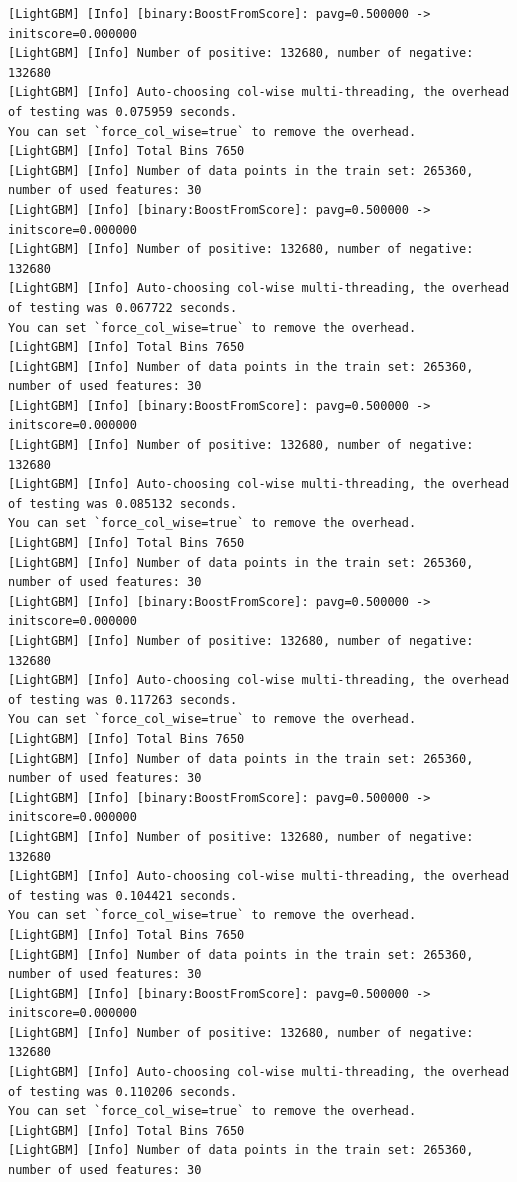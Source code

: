 \documentclass[
  letterpaper,
  DIV=11,
  numbers=noendperiod]{scrartcl}
\begin{document}
\begin{verbatim}
[LightGBM] [Info] [binary:BoostFromScore]: pavg=0.500000 -> initscore=0.000000
[LightGBM] [Info] Number of positive: 132680, number of negative: 132680
[LightGBM] [Info] Auto-choosing col-wise multi-threading, the overhead of testing was 0.075959 seconds.
You can set `force_col_wise=true` to remove the overhead.
[LightGBM] [Info] Total Bins 7650
[LightGBM] [Info] Number of data points in the train set: 265360, number of used features: 30
[LightGBM] [Info] [binary:BoostFromScore]: pavg=0.500000 -> initscore=0.000000
[LightGBM] [Info] Number of positive: 132680, number of negative: 132680
[LightGBM] [Info] Auto-choosing col-wise multi-threading, the overhead of testing was 0.067722 seconds.
You can set `force_col_wise=true` to remove the overhead.
[LightGBM] [Info] Total Bins 7650
[LightGBM] [Info] Number of data points in the train set: 265360, number of used features: 30
[LightGBM] [Info] [binary:BoostFromScore]: pavg=0.500000 -> initscore=0.000000
[LightGBM] [Info] Number of positive: 132680, number of negative: 132680
[LightGBM] [Info] Auto-choosing col-wise multi-threading, the overhead of testing was 0.085132 seconds.
You can set `force_col_wise=true` to remove the overhead.
[LightGBM] [Info] Total Bins 7650
[LightGBM] [Info] Number of data points in the train set: 265360, number of used features: 30
[LightGBM] [Info] [binary:BoostFromScore]: pavg=0.500000 -> initscore=0.000000
[LightGBM] [Info] Number of positive: 132680, number of negative: 132680
[LightGBM] [Info] Auto-choosing col-wise multi-threading, the overhead of testing was 0.117263 seconds.
You can set `force_col_wise=true` to remove the overhead.
[LightGBM] [Info] Total Bins 7650
[LightGBM] [Info] Number of data points in the train set: 265360, number of used features: 30
[LightGBM] [Info] [binary:BoostFromScore]: pavg=0.500000 -> initscore=0.000000
[LightGBM] [Info] Number of positive: 132680, number of negative: 132680
[LightGBM] [Info] Auto-choosing col-wise multi-threading, the overhead of testing was 0.104421 seconds.
You can set `force_col_wise=true` to remove the overhead.
[LightGBM] [Info] Total Bins 7650
[LightGBM] [Info] Number of data points in the train set: 265360, number of used features: 30
[LightGBM] [Info] [binary:BoostFromScore]: pavg=0.500000 -> initscore=0.000000
[LightGBM] [Info] Number of positive: 132680, number of negative: 132680
[LightGBM] [Info] Auto-choosing col-wise multi-threading, the overhead of testing was 0.110206 seconds.
You can set `force_col_wise=true` to remove the overhead.
[LightGBM] [Info] Total Bins 7650
[LightGBM] [Info] Number of data points in the train set: 265360, number of used features: 30

\end{verbatim}
\end{document}

